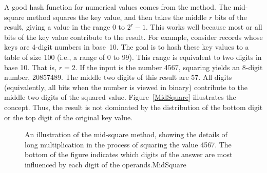 \begin{example}
A good hash function for numerical values comes from
the  method.
The mid-square method squares the key value, and then takes the middle
\(r\) bits of the result, giving a value in the range
0 to \(2^r-1\).
This works well because most or all bits of the key value contribute
to the result.
For example, consider records whose keys are 4-digit numbers in
base~10.
The goal is to hash these key values to a table of size 100
(i.e., a range of 0 to 99).
This range is equivalent to two digits in base 10.
That is, \(r = 2\).
If the input is the number 4567, squaring yields an 8-digit number,
20857489.
The middle two digits of this result are 57.
All digits (equivalently, all bits when the number is viewed in binary)
contribute to the middle two digits of the squared value.
Figure~\ref{MidSquare} illustrates the concept.
Thus, the result is not dominated by the distribution of the bottom
digit or the top digit of the original key value.

\begin{figure}
\bigskip

{An illustration of the mid-square method, showing the details of long
multiplication in the process of squaring the value 4567.
The bottom of the figure indicates which digits of the answer are most
influenced by each digit of
the operands.}{MidSquare}

\bigskip
\bigskip

\end{figure}
\end{example}

